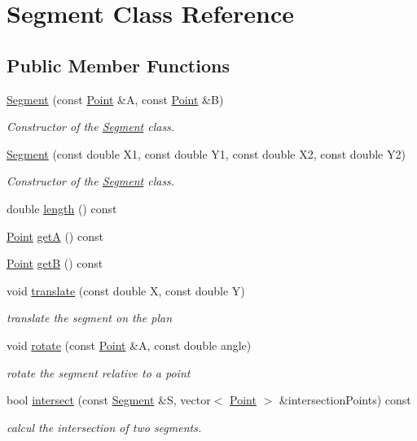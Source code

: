 \hypertarget{class_segment}{}\section{Segment Class Reference}
\label{class_segment}
\subsection*{Public Member Functions}
\begin{DoxyCompactItemize}
\item 
\hyperlink{class_segment_a9ef80a38420c7f5cd5b9e38a5b3b9aa8}{Segment} (const \hyperlink{class_point}{Point} \&A, const \hyperlink{class_point}{Point} \&B)
\begin{DoxyCompactList}\small\item\em Constructor of the \hyperlink{class_segment}{Segment} class. \end{DoxyCompactList}\item 
\hyperlink{class_segment_a8b4be8979301698353b32b0fcddf12b2}{Segment} (const double X1, const double Y1, const double X2, const double Y2)
\begin{DoxyCompactList}\small\item\em Constructor of the \hyperlink{class_segment}{Segment} class. \end{DoxyCompactList}\item 
double \hyperlink{class_segment_a2821b168d6fdaba5cf63a89d8c3172f4}{length} () const
\item 
\hyperlink{class_point}{Point} \hyperlink{class_segment_af7966e09f5f1b20e3497a87fc3bf8fd4}{getA} () const
\item 
\hyperlink{class_point}{Point} \hyperlink{class_segment_aa3d51597ac979d8df485ec5d61493b03}{getB} () const
\item 
void \hyperlink{class_segment_a265c7d9b2b36e633c8329a576ecf83cb}{translate} (const double X, const double Y)
\begin{DoxyCompactList}\small\item\em translate the segment on the plan \end{DoxyCompactList}\item 
void \hyperlink{class_segment_ab6249f23914eaa6ab4864c46202039bd}{rotate} (const \hyperlink{class_point}{Point} \&A, const double angle)
\begin{DoxyCompactList}\small\item\em rotate the segment relative to a point \end{DoxyCompactList}\item 
bool \hyperlink{class_segment_a379ebf65c2be2ce40d603ed33dae8843}{intersect} (const \hyperlink{class_segment}{Segment} \&S, vector$<$ \hyperlink{class_point}{Point} $>$ \&intersection\+Points) const
\begin{DoxyCompactList}\small\item\em calcul the intersection of two segments. \end{DoxyCompactList}\end{DoxyCompactItemize}
